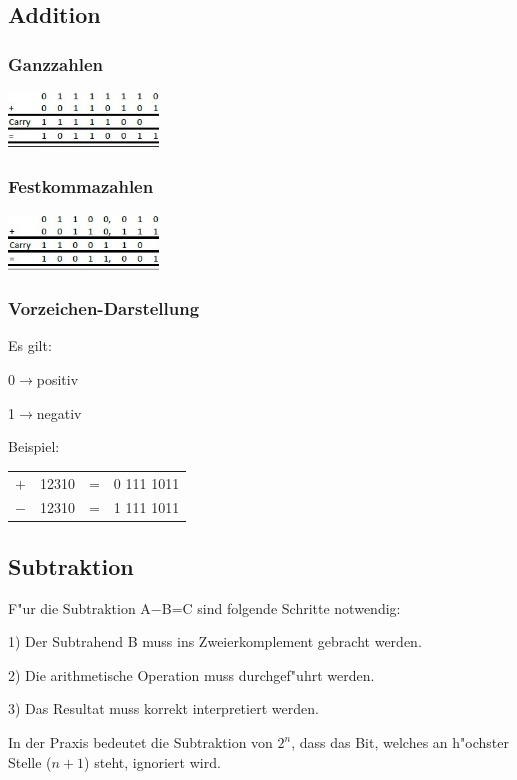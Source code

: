 \subsection{Addition}
	\begin{multicols}{3}
		\subsubsection{Ganzzahlen}
		\includegraphics[width=0.3\textwidth]{pics/zahlensysteme/addition1.jpg}
		
		\subsubsection{Festkommazahlen}
		\includegraphics[width=0.3\textwidth]{pics/zahlensysteme/addition2.jpg}
		
		\subsubsection{Vorzeichen-Darstellung}
		\begin{minipage}[c]{1.5 cm}
			Es gilt: 
			\newline
		\end{minipage}
		\begin{minipage}[c]{3.5 cm}
			\begin{compactitem}
				\item 0$\rightarrow$positiv
				\item 1$\rightarrow$negativ
			\end{compactitem}
		\end{minipage}
		Beispiel:\\
		\begin{tabular}{llll}
			$+$ & 12310 & = & 0 111 1011\\
			$-$ & 12310 & = & 1 111 1011\\
		\end{tabular}
	\end{multicols}

\subsection{Subtraktion}
	F"ur die Subtraktion A$-$B=C sind folgende Schritte notwendig:
	\begin{compactitem}
		\item 1) Der Subtrahend B muss ins Zweierkomplement gebracht werden.
		\item 2) Die arithmetische Operation muss durchgef"uhrt werden.
		\item 3) Das Resultat muss korrekt interpretiert werden.
	\end{compactitem}
	In der Praxis bedeutet die Subtraktion von $2^n$, dass das Bit, welches an h"ochster Stelle ($n+1$) steht, ignoriert wird.
	

